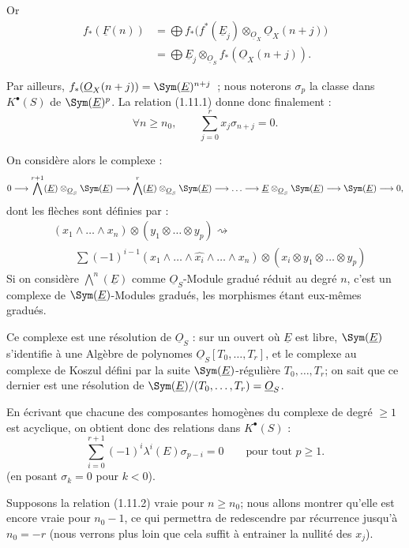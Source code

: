 
Or
\[
\begin{aligned}
  f_*(\underline{F}(n))
  &=\bigoplus f_*\bigl(f^*(\underline{E}_j)\otimes_{\underline{O}_X}\underline{O}_X(n+j)\bigr)\\
  &=\bigoplus \underline{E}_j\otimes_{\underline{O}_S} f_*(\underline{O}_X(n+j)).
\end{aligned}
\]

Par
ailleurs, \(f_*(\underline{O}_X(n+j))=\Sym(\underline{E})^{n+j}\)~; nous noterons \(\sigma_p\) la classe dans \(K^{\bullet}(S)\) de \(\Sym(\underline{E})^p\). La relation (1.11.1) donne donc finalement :
\begin{equation}\tag{1.11.2}
  \forall n\geq n_0,
  \qquad
  \sum_{j=0}^r x_j\sigma_{n+j}=0.
\end{equation}

On considère alors le complexe :
\[
  0\longrightarrow \bigwedge^{r+1}(\underline{E})\otimes_{\underline{O}_S}\Sym(\underline{E})
  \longrightarrow \bigwedge^r(\underline{E})\otimes_{\underline{O}_S}\Sym(\underline{E})
  \longrightarrow\ldots\longrightarrow
  \underline{E}\otimes_{\underline{O}_S}\Sym(\underline{E})
  \longrightarrow \Sym(\underline{E})\longrightarrow0,
\]
dont les flèches sont définies par :
\[
\begin{aligned}
&(x_1\wedge\ldots\wedge x_n)\otimes(y_1\otimes\ldots\otimes y_p)\rightsquigarrow{}\\
&\qquad \sum(-1)^{i-1}(x_1\wedge\ldots\wedge\widehat{x_i}\wedge\ldots\wedge x_n)
\otimes(x_i\otimes y_1\otimes\ldots\otimes y_p)
\end{aligned}
\]
Si on considère \(\bigwedge^n(\underline{E})\) comme \(\underline{O}_S\)-Module gradué réduit au degré \(n\), c'est un complexe de \(\Sym(\underline{E})\)-Modules gradués, les morphismes étant eux-mêmes gradués.

Ce complexe est une résolution de \(\underline{O}_S\) : sur un ouvert où \(\underline{E}\) est libre, \(\Sym(\underline{E})\) s'identifie à une Algèbre de polynomes \(\underline{O}_S[T_0,\ldots,T_r]\), et le complexe au complexe de Koszul défini par la suite \(\Sym(\underline{E})\)-régulière \(T_0,\ldots,T_r\); on sait que ce dernier est une résolution de \(\Sym(\underline{E})/(T_0,\ldots,T_r)=\underline{O}_S\).

En écrivant que chacune des composantes homogènes du complexe de degré \(\geq1\) est acyclique, on obtient donc des relations dans \(K^{\bullet}(S)\) :
\begin{equation}\tag{1.11.3}
  \sum_{i=0}^{r+1}(-1)^i\lambda^i(E)\sigma_{p-i}=0
  \qquad\text{pour tout }p\geq1.
\end{equation}
(en posant \(\sigma_k=0\) pour \(k<0\)).

Supposons la relation (1.11.2) vraie pour \(n\geq n_0\); nous allons montrer qu'elle est encore vraie pour \(n_0-1\), ce qui permettra de redescendre par récurrence jusqu'à \(n_0=-r\) (nous verrons plus loin que cela suffit à entrainer la nullité des \(x_j\)).

